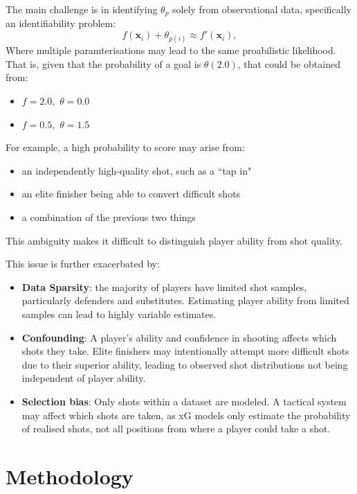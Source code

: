 \documentclass{article}
\begin{document}
The main challenge is in identifying $\theta_{p}$ solely from observational data, specifically an identifiability problem:
\begin{equation} \label{xgpi}
f(\mathbf{x}_i) + \theta_{p(i)} \approx f'(\mathbf{x}_i),
\end{equation}\label{eq5}
Where multiple paramterisations may lead to the same proabilistic likelihood. That is, given that the probability of a goal is $\theta(2.0)$, that could be obtained from:
\begin{itemize}
    \item $f = 2.0,$ $\theta = 0.0$
    \item $f = 0.5,$ $\theta = 1.5$
\end{itemize}
For example, a high probability to score may arise from:
\begin{itemize}
    \item an independently high-quality shot, such as a ``tap in"
    \item an elite finisher being able to convert difficult shots
    \item a combination of the previous two things
\end{itemize}
This ambiguity makes it difficult to distinguish player ability from shot quality. 

This issue is further exacerbated by:
\begin{itemize}
    \item \textbf{Data Sparsity}: the majority of players have limited shot samples, particularly defenders and substitutes. Estimating player ability from limited samples can lead to highly variable estimates.
    \item \textbf{Confounding}: A player's ability and confidence in shooting affects which shots they take. Elite finishers may intentionally attempt more difficult shots due to their superior ability, leading to observed shot distributions not being independent of player ability.
    \item \textbf{Selection bias}: Only shots within a dataset are modeled. A tactical system may affect which shots are taken, as xG models only estimate the probability of realised shots, not all positions from where a player could take a shot.
\end{itemize}

\section{Methodology}
\end{document}
